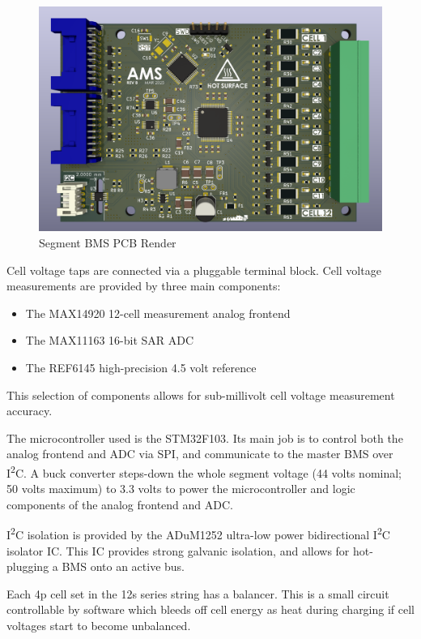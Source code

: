 \documentclass[12pt, a4paper]{article}
\newcommand{\iic}{I\textsuperscript{2}C}
\begin{document}
\begin{figure}[H]
  \centering
  \includegraphics[width=\linewidth]{bms.png}
  \caption{Segment BMS PCB Render}
  \label{fig:bms-pcb}
\end{figure}

Cell voltage taps are connected via a pluggable terminal block.
Cell voltage measurements are provided by three main components:
\begin{itemize}
\item The MAX14920 12-cell measurement analog frontend
\item The MAX11163 16-bit SAR ADC
\item The REF6145 high-precision 4.5 volt reference
\end{itemize}
This selection of components allows for sub-millivolt cell voltage measurement accuracy.

The microcontroller used is the STM32F103.
Its main job is to control both the analog frontend and ADC via SPI, and communicate to the master BMS over \iic{}.
A buck converter steps-down the whole segment voltage (44 volts nominal; 50 volts maximum) to 3.3 volts to power the microcontroller and logic components of the analog frontend and ADC.

\iic{} isolation is provided by the ADuM1252 ultra-low power bidirectional \iic{} isolator IC.
This IC provides strong galvanic isolation, and allows for hot-plugging a BMS onto an active bus.

Each 4p cell set in the 12s series string has a balancer.
This is a small circuit controllable by software which bleeds off cell energy as heat during charging if cell voltages start to become unbalanced.
\end{document}
